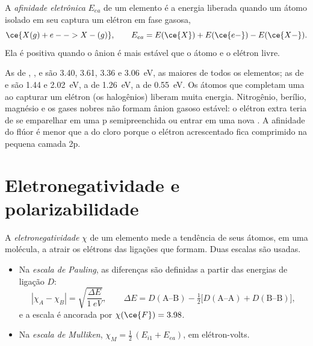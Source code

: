 \begin{definition}\label{def:b1:periodicity:electron-affinity}
A \emph{afinidade eletrônica} $E_{ea}$ de um
elemento é a energia liberada quando um átomo isolado em seu  captura um elétron em fase gasosa,
\[
  \ce{X(g) + e- -> X-(g)}, \qquad E_{ea} = E(\ce{X}) + E(\ce{e-}) - E(\ce{X-}) .
\]
Ela é positiva quando o ânion é mais estável que o átomo e o elétron
livre.
\end{definition}

\begin{example}\label{ex:b1:periodicity:ea}
As  de , ,  e  são 3.40,
3.61, 3.36 e \qty{3.06}{eV}, as maiores de todos os elementos; as de
 e  são 1.44 e \qty{2.02}{eV}, a de  \qty{1.26}{eV},
a de  \qty{0.55}{eV}. Os átomos que completam uma  ao
capturar um elétron (os halogênios) liberam muita energia. Nitrogênio,
berílio, magnésio e os gases nobres não formam ânion gasoso estável: o
elétron extra teria de se emparelhar em uma  p semipreenchida
ou entrar em uma nova . A afinidade do flúor é menor que a do
cloro porque o elétron acrescentado fica comprimido na pequena camada 2p.
\end{example}

\section{Eletronegatividade e polarizabilidade}

\begin{definition}[Eletronegatividade]\label{def:b1:periodicity:electronegativity}
A \emph{eletronegatividade} $\chi$ de um
elemento mede a tendência de seus átomos, em uma molécula, a atrair
os elétrons das ligações que formam. Duas escalas são usadas.
\begin{itemize}
  \item Na \emph{escala de Pauling}, as diferenças
        são definidas a partir das energias de ligação $D$:
        \[
          |\chi_A - \chi_B| = \sqrt{\frac{\Delta E}{\qty{1}{eV}}}, \qquad
          \Delta E = D(\text{A--B}) - \tfrac12\big[D(\text{A--A}) +
          D(\text{B--B})\big],
        \]
        e a escala é ancorada por $\chi(\ce{F}) = 3.98$.
  \item Na \emph{escala de Mulliken},
        $\chi_M = \tfrac12\,(E_{i1} + E_{ea})$, em elétron-volts.
\end{itemize}
\end{definition}

